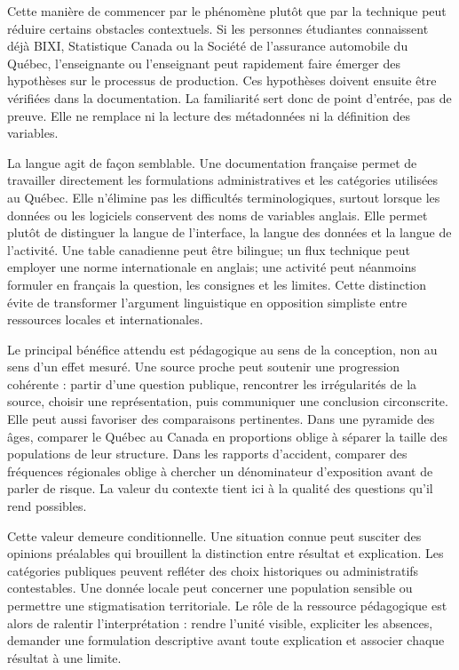 Cette manière de commencer par le phénomène plutôt que par la technique peut réduire certains obstacles contextuels. Si les personnes étudiantes connaissent déjà BIXI, Statistique Canada ou la Société de l'assurance automobile du Québec, l'enseignante ou l'enseignant peut rapidement faire émerger des hypothèses sur le processus de production. Ces hypothèses doivent ensuite être vérifiées dans la documentation. La familiarité sert donc de point d'entrée, pas de preuve. Elle ne remplace ni la lecture des métadonnées ni la définition des variables.

La langue agit de façon semblable. Une documentation française permet de travailler directement les formulations administratives et les catégories utilisées au Québec. Elle n'élimine pas les difficultés terminologiques, surtout lorsque les données ou les logiciels conservent des noms de variables anglais. Elle permet plutôt de distinguer la langue de l'interface, la langue des données et la langue de l'activité. Une table canadienne peut être bilingue; un flux technique peut employer une norme internationale en anglais; une activité peut néanmoins formuler en français la question, les consignes et les limites. Cette distinction évite de transformer l'argument linguistique en opposition simpliste entre ressources locales et internationales.

Le principal bénéfice attendu est pédagogique au sens de la conception, non au sens d'un effet mesuré. Une source proche peut soutenir une progression cohérente : partir d'une question publique, rencontrer les irrégularités de la source, choisir une représentation, puis communiquer une conclusion circonscrite. Elle peut aussi favoriser des comparaisons pertinentes. Dans une pyramide des âges, comparer le Québec au Canada en proportions oblige à séparer la taille des populations de leur structure. Dans les rapports d'accident, comparer des fréquences régionales oblige à chercher un dénominateur d'exposition avant de parler de risque. La valeur du contexte tient ici à la qualité des questions qu'il rend possibles.

Cette valeur demeure conditionnelle. Une situation connue peut susciter des opinions préalables qui brouillent la distinction entre résultat et explication. Les catégories publiques peuvent refléter des choix historiques ou administratifs contestables. Une donnée locale peut concerner une population sensible ou permettre une stigmatisation territoriale. Le rôle de la ressource pédagogique est alors de ralentir l'interprétation : rendre l'unité visible, expliciter les absences, demander une formulation descriptive avant toute explication et associer chaque résultat à une limite.

